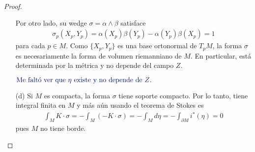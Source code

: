 \documentclass[11pt]{article}
\newcommand{\paint}[1]{\color{color}{#1}}
\newcommand{\tpaing}[1]{\paint{\text{#1}}}
\begin{document}
\begin{proof}
\begin{itemize}[listparindent = \parindent]
Por otro lado, su wedge $\sigma = \alpha \wedge \beta$ satisface
\begin{align*}
\sigma_p(X_p,Y_p) = \alpha(X_p)\beta(Y_p) - \alpha(Y_p)\beta(X_p) = 1
\end{align*}
para cada $p \in M$. Como $\{X_p,Y_p\}$ es una base ortonormal de $T_pM$, la forma $\sigma$ es necesariamente la forma de volumen riemanniano de $M$. En particular, está determinada por la métrica y no depende del campo $Z$.
\begin{center}
$\tpaing{Me faltó ver que $\eta$ existe y no depende de $Z$.}$
\end{center}
\item[(d)] Si $M$ es compacta, la forma $\sigma$ tiene soporte compacto. Por lo tanto, tiene integral finita en $M$ y más aún usando el teorema de Stokes es
\begin{align*}
\int_M K \cdot \sigma = -\int_M (-K \cdot \sigma) = -\int_M d\eta = -\int_{\partial M}i^*(\eta) = 0
\end{align*}
pues $M$ no tiene borde.
\end{itemize}
\end{proof}
\end{document}
